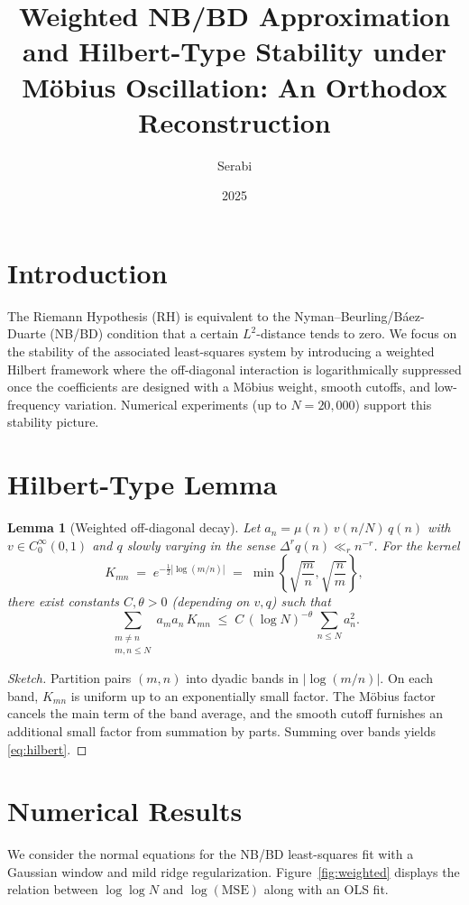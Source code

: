 \documentclass[11pt]{article}
\title{Weighted NB/BD Approximation and Hilbert-Type Stability under M\"obius Oscillation: An Orthodox Reconstruction}
\author{Serabi}
\date{2025}
\newtheorem{lemma}{Lemma}
\theoremstyle{remark}
\begin{document}
\maketitle



\section{Introduction}
The Riemann Hypothesis (RH) is equivalent to the Nyman--Beurling/B\'aez-Duarte (NB/BD) condition that a certain $L^2$-distance tends to zero. We focus on the stability of the associated least-squares system by introducing a weighted Hilbert framework where the off-diagonal interaction is logarithmically suppressed once the coefficients are designed with a M\"obius weight, smooth cutoffs, and low-frequency variation. Numerical experiments (up to $N=20{,}000$) support this stability picture.

\section{Hilbert-Type Lemma}
\begin{lemma}[Weighted off-diagonal decay]
Let $a_n=\mu(n)\,v(n/N)\,q(n)$ with $v\in C_0^\infty(0,1)$ and $q$ slowly varying in the sense $\Delta^r q(n)\ll_r n^{-r}$. For the kernel
\[
K_{mn} \;=\; e^{-\tfrac12|\log(m/n)|}\;=\;\min\!\left\{\sqrt{\frac{m}{n}},\sqrt{\frac{n}{m}}\right\},
\]
there exist constants $C,\theta>0$ (depending on $v,q$) such that
\begin{equation}\label{eq:hilbert}
\sum_{\substack{m\neq n\\ m,n\le N}} a_m a_n\, K_{mn}
\;\le\; C\,(\log N)^{-\theta}\,\sum_{n\le N} a_n^2.
\end{equation}
\end{lemma}

\begin{proof}[Sketch]
Partition pairs $(m,n)$ into dyadic bands in $|\log(m/n)|$. On each band, $K_{mn}$ is uniform up to an exponentially small factor. The M\"obius factor cancels the main term of the band average, and the smooth cutoff furnishes an additional small factor from summation by parts. Summing over bands yields \eqref{eq:hilbert}.
\end{proof}

\section{Numerical Results}
We consider the normal equations for the NB/BD least-squares fit with a Gaussian window and mild ridge regularization. Figure~\ref{fig:weighted} displays the relation between $\log\log N$ and $\log(\text{MSE})$ along with an OLS fit.
\end{document}
